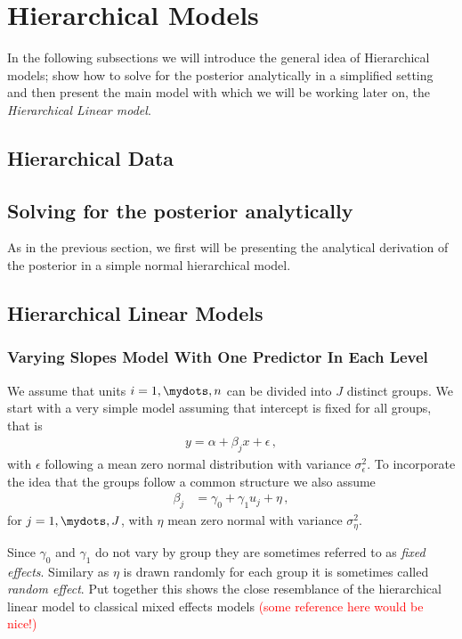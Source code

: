 \section{Hierarchical Models}
In the following subsections we will introduce the general idea of Hierarchical
models; show how to solve for the posterior analytically in a simplified setting
and then present the main model with which we will be working later on, the \emph{Hierarchical Linear model}.

\subsection{Hierarchical Data}

\subsection{Solving for the posterior analytically}
As in the previous section, we first will be presenting the analytical
derivation of the posterior in a simple normal hierarchical model.

\subsection{Hierarchical Linear Models}

\subsubsection{Varying Slopes Model With One Predictor In Each Level}
We assume that units $i = 1,\mydots,n$ can be divided into $J$ distinct groups.
We start with a very simple model assuming that intercept is fixed for all
groups, that is
\begin{align}
  y = \alpha + \beta_j x + \epsilon \,,
\end{align}
with $\epsilon$ following a mean zero normal distribution with variance
$\sigma_{\epsilon}^2$.
To incorporate the idea that the groups follow a common structure we also
assume
\begin{align}
  \beta_j &= \gamma_0 + \gamma_1 u_j + \eta \,,
\end{align}
for $j = 1,\mydots,J$, with $\eta$ mean zero normal with variance $\sigma_\eta^2$.

Since $\gamma_0$ and $\gamma_1$ do not vary by group they are sometimes referred
to as \emph{fixed effects}. Similary as $\eta$ is drawn randomly for each group
it is sometimes called \emph{random effect}. Put together this shows the close
resemblance of the hierarchical linear model to classical mixed effects models
\textcolor{red}{(some reference here would be nice!)}

